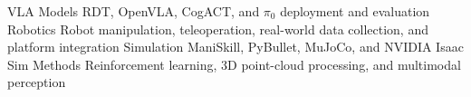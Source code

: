 
\begin{cvskills}
  \cvskill
    {VLA Models}
    {RDT, OpenVLA, CogACT, and $\pi_0$ deployment and evaluation}
  \cvskill
    {Robotics}
    {Robot manipulation, teleoperation, real-world data collection, and platform integration}
  \cvskill
    {Simulation}
    {ManiSkill, PyBullet, MuJoCo, and NVIDIA Isaac Sim}
  \cvskill
    {Methods}
    {Reinforcement learning, 3D point-cloud processing, and multimodal perception}
\end{cvskills}
